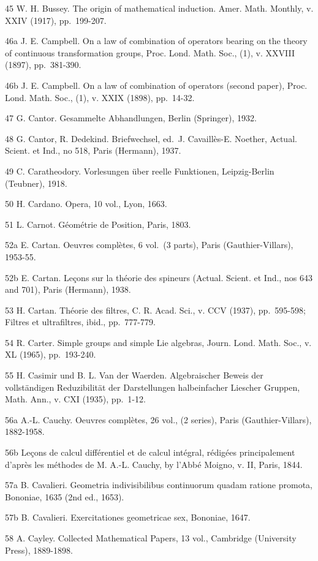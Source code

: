 45 W. H. Bussey. The origin of mathematical induction. Amer. Math. Monthly, v. XXIV (1917), pp.~199-207.

46a J. E. Campbell. On a law of combination of operators bearing on the theory of continuous transformation groups, Proc. Lond. Math. Soc., (1), v. XXVIII (1897), pp.~381-390.

46b J. E. Campbell. On a law of combination of operators (second paper), Proc. Lond. Math. Soc., (1), v. XXIX (1898), pp.~14-32.

47 G. Cantor. Gesammelte Abhandlungen, Berlin (Springer), 1932.

48 G. Cantor, R. Dedekind. Briefwechsel, ed.~J. Cavaillès-E. Noether, Actual. Scient. et Ind., no 518, Paris (Hermann), 1937.

49 C. Caratheodory. Vorlesungen über reelle Funktionen, Leipzig-Berlin (Teubner), 1918.

50 H. Cardano. Opera, 10 vol., Lyon, 1663.

51 L. Carnot. Géométrie de Position, Paris, 1803.

52a E. Cartan. Oeuvres complètes, 6 vol.~(3 parts), Paris (Gauthier-Villars), 1953-55.

52b E. Cartan. Leçons sur la théorie des spineurs (Actual. Scient. et Ind., nos 643 and 701), Paris (Hermann), 1938.

53 H. Cartan. Théorie des filtres, C. R. Acad. Sci., v. CCV (1937), pp.~595-598; Filtres et ultrafiltres, ibid., pp.~777-779.

54 R. Carter. Simple groups and simple Lie algebras, Journ. Lond. Math. Soc., v. XL (1965), pp.~193-240.

55 H. Casimir und B. L. Van der Waerden. Algebraischer Beweis der vollständigen Reduzibilität der Darstellungen halbeinfacher Liescher Gruppen, Math. Ann., v. CXI (1935), pp.~1-12.

56a A.-L. Cauchy. Oeuvres complètes, 26 vol., (2 series), Paris (Gauthier-Villars), 1882-1958.

56b Leçons de calcul différentiel et de calcul intégral, rédigées principalement d'après les méthodes de M. A.-L. Cauchy, by l'Abbé Moigno, v. II, Paris, 1844.

57a B. Cavalieri. Geometria indivisibilibus continuorum quadam ratione promota, Bononiae, 1635 (2nd ed., 1653).

57b B. Cavalieri. Exercitationes geometricae sex, Bononiae, 1647.

58 A. Cayley. Collected Mathematical Papers, 13 vol., Cambridge (University Press), 1889-1898.

